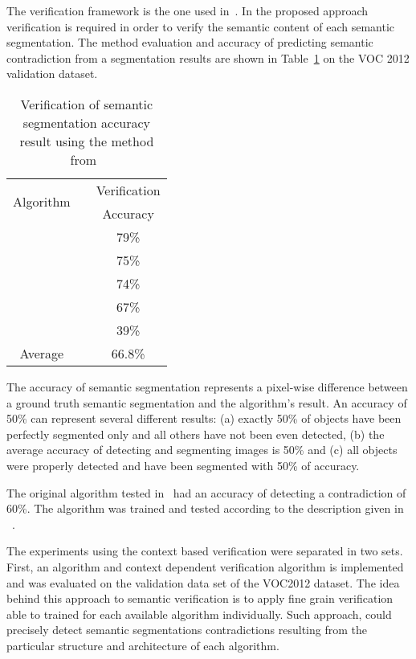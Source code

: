 \documentclass[conference]{IEEEtran}
\begin{document}
The verification framework is the one used in~\cite{lukac:15}. In the proposed approach verification is required in order to verify the semantic content of each semantic segmentation. The method evaluation and accuracy of predicting semantic contradiction  from a segmentation results are shown in Table~\ref{tab:verif0} on the VOC 2012 validation dataset. 

\begin{table}[bht]
\centering
	\caption{\label{tab:verif0} Verification of semantic segmentation accuracy result using the method from~\cite{lukac:15}}
	\begin{tabular}{|cc|c|}
		\hline
		\multirow{2}{*}{Algorithm}& & Verification\\
		&  & Accuracy\\
		\hline
		~\cite{simonyan:15}& & 79\%\\
		~\cite{chen:14}& & 75\%\\
		~\cite{bharath:14}& & 74\%\\
		~\cite{ladicky:13}& & 67\%\\
		~\cite{ion:11}& & 39\%\\
		\hline
		Average& &66.8\%\\
		\hline
	\end{tabular}
\end{table}
The accuracy of semantic segmentation represents a pixel-wise difference between a ground truth semantic segmentation and the algorithm's result. An accuracy of 50\% can represent several different results: (a) exactly 50\% of objects have been perfectly segmented only and all others have not been even detected, (b) the average accuracy of detecting and segmenting images is 50\% and (c) all objects were properly detected and have been segmented with 50\% of accuracy.

The original algorithm tested in~\cite{lukac:15,lukac:16} had an accuracy of detecting a contradiction of 60\%. The algorithm was trained and tested according to the description given in ~\cite{lukac:15}. 

The experiments using the context based verification were separated in two sets. First, an algorithm and context dependent verification algorithm is implemented and was evaluated on the validation data set of the VOC2012 dataset. The idea behind this approach to semantic verification is to apply fine grain verification able to trained for each available algorithm individually. Such approach, could precisely detect semantic segmentations contradictions resulting from the particular structure and architecture of each algorithm.
\end{document}
